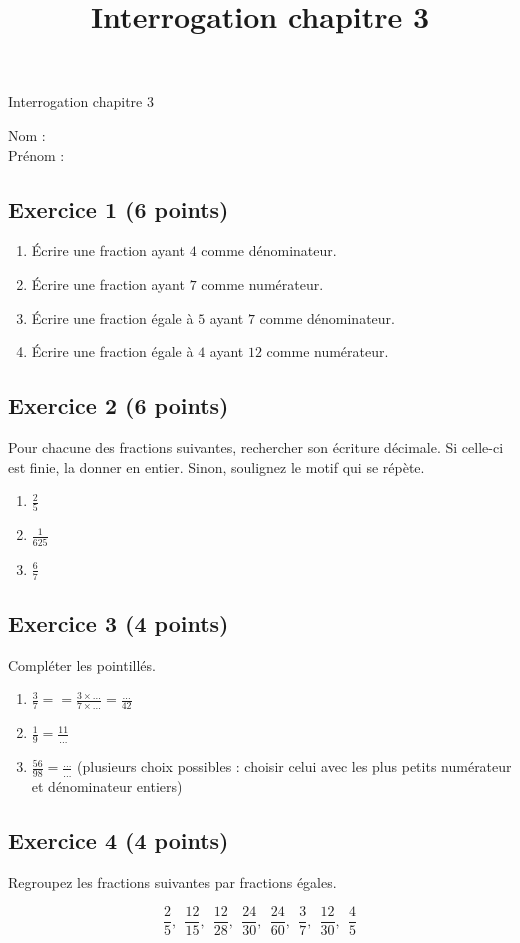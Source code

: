 \documentclass[14 pt]{extarticle}
\title{Interrogation chapitre 3}
\date{}
\theoremstyle{plain}
\begin{document}
\begin{center}{\Large Interrogation chapitre 3}\\ 
 \end{center}
 Nom : \\
 Prénom : \\
 \subsection*{Exercice 1 (6 points)}
 

\begin{enumerate}
\item Écrire une fraction ayant $4$ comme dénominateur. 
\item Écrire une fraction ayant $7$ comme numérateur. 
\item Écrire une fraction égale à $5$ ayant $7$ comme dénominateur.
\item Écrire une fraction égale à $4$ ayant $12$ comme numérateur. 
\end{enumerate}

\subsection*{Exercice 2 (6 points)}
Pour chacune des fractions suivantes, 
rechercher son écriture décimale. Si celle-ci est finie, la donner en entier. Sinon, soulignez le motif qui se répète. 

\begin{enumerate}
\item $\frac25$
\item $\frac1{625}$ 
\item $\frac{6}{7}$
\end{enumerate}
\subsection*{Exercice 3 (4 points)}

Compléter les pointillés. 

\begin{enumerate}
\item $\frac37= = \frac{3 \times \ldots}{7 \times \ldots}= 
\frac{\ldots}{42}$
\item $\frac1{9}= \frac{11}{\ldots}$
\item $\frac{56}{98}= \frac\ldots{\ldots}$  (plusieurs choix possibles : choisir celui avec les plus petits numérateur et dénominateur entiers)
\end{enumerate}

\subsection*{Exercice 4 (4 points)}

Regroupez les fractions suivantes par fractions égales. 

\[ \frac25, \ \  
 \frac{12}{15}, \ \    
 \frac{12}{28}, \ \  
 \frac{24}{30}, \ \  
  \frac{24}{60}, \ \  
   \frac37, \ \  
      \frac{12}{30}, \ \  
       \frac{4}{5}\]


 	
\end{document}
